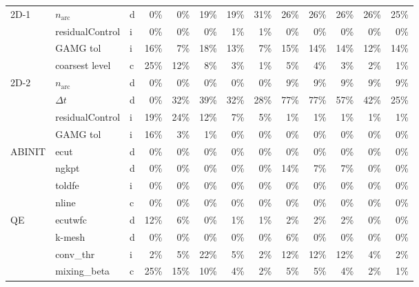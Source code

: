 \begin{tabular}{lllrrrrrrrrrr}
\addlinespace[1pt]
2D-1 & $n_\mathrm{arc}$ & d & 0\% & 0\% & 19\% & 19\% & 31\% & 26\% & 26\% & 26\% & 26\% & 25\% \\
 & residualControl & i & 0\% & 0\% & 0\% & 1\% & 1\% & 0\% & 0\% & 0\% & 0\% & 0\% \\
 & GAMG tol & i & 16\% & 7\% & 18\% & 13\% & 7\% & 15\% & 14\% & 14\% & 12\% & 14\% \\
 & coarsest level & c & 25\% & 12\% & 8\% & 3\% & 1\% & 5\% & 4\% & 3\% & 2\% & 1\% \\
\addlinespace[1pt]
2D-2 & $n_\mathrm{arc}$ & d & 0\% & 0\% & 0\% & 0\% & 0\% & 9\% & 9\% & 9\% & 9\% & 9\% \\
 & $\Delta t$ & d & 0\% & 32\% & 39\% & 32\% & 28\% & 77\% & 77\% & 57\% & 42\% & 25\% \\
 & residualControl & i & 19\% & 24\% & 12\% & 7\% & 5\% & 1\% & 1\% & 1\% & 1\% & 1\% \\
 & GAMG tol & i & 16\% & 3\% & 1\% & 0\% & 0\% & 0\% & 0\% & 0\% & 0\% & 0\% \\
\addlinespace[1pt]
ABINIT & ecut & d & 0\% & 0\% & 0\% & 0\% & 0\% & 0\% & 0\% & 0\% & 0\% & 0\% \\
 & ngkpt & d & 0\% & 0\% & 0\% & 0\% & 0\% & 14\% & 7\% & 7\% & 0\% & 0\% \\
 & toldfe & i & 0\% & 0\% & 0\% & 0\% & 0\% & 0\% & 0\% & 0\% & 0\% & 0\% \\
 & nline & c & 0\% & 0\% & 0\% & 0\% & 0\% & 0\% & 0\% & 0\% & 0\% & 0\% \\
\addlinespace[1pt]
QE & ecutwfc & d & 12\% & 6\% & 0\% & 1\% & 1\% & 2\% & 2\% & 2\% & 0\% & 0\% \\
 & k-mesh & d & 0\% & 0\% & 0\% & 0\% & 0\% & 6\% & 0\% & 0\% & 0\% & 0\% \\
 & conv\_thr & i & 2\% & 5\% & 22\% & 5\% & 2\% & 12\% & 12\% & 12\% & 4\% & 2\% \\
 & mixing\_beta & c & 25\% & 15\% & 10\% & 4\% & 2\% & 5\% & 5\% & 4\% & 2\% & 1\% \\
\bottomrule
\end{tabular}